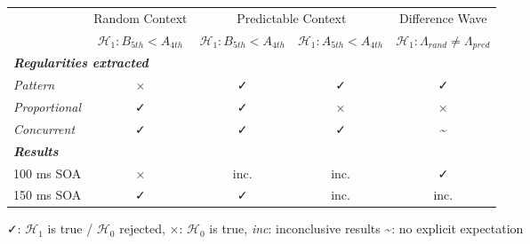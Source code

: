 

\begin{table}
\centering
\begin{tabular*}{\textwidth}{lcllc} 
\toprule
                                                                                                               & Random Context                               & \multicolumn{2}{c}{Predictable Context}               & Difference Wave                                                \\ 
\cmidrule(lr){2-2}\cmidrule(lr){3-4}\cmidrule(lr){5-5}
\multicolumn{1}{c}{}                                                                         & \multicolumn{1}{c}{$\mathcal{H_1}: B_{5th}<A_{4th}$} & $\mathcal{H_1}: B_{5th}<A_{4th}$     & $\mathcal{H_1}: A_{5th}<A_{4th}$     & \multicolumn{1}{c}{$\mathcal{H_1}: \Lambda_{rand} \neq \Lambda_{pred}$ }  \\ 
\midrule
\multicolumn{5}{l}{\textbf{\textit{Regularities extracted}}}  \\
\hspace{3mm}\textit{Pattern}                                                                                 & ×                                     & \multicolumn{1}{c}{✓} & \multicolumn{1}{c}{✓} & ✓                                                          \\
\hspace{3mm}\textit{Proportional}                                                                             & ✓                                     & \multicolumn{1}{c}{✓} & \multicolumn{1}{c}{×} & ×                                                          \\
\hspace{3mm}\textit{Concurrent} & ✓                                     & \multicolumn{1}{c}{✓} & \multicolumn{1}{c}{✓} & \textasciitilde{}                                          \\
\multicolumn{5}{l}{\textbf{\textit{Results}}}  \\
\hspace{3mm}100 ms SOA                                                                                                         & \multicolumn{1}{c}{×}                & \multicolumn{1}{c}{inc.}                 & \multicolumn{1}{c}{inc.}                    & \multicolumn{1}{c}{✓}                                      \\
\hspace{3mm}150 ms SOA                                                                                                        & \multicolumn{1}{c}{✓}                 & \multicolumn{1}{c}{✓}                      & \multicolumn{1}{c}{inc.}                    & \multicolumn{1}{c}{inc.}                                    \\
\bottomrule
\end{tabular*}
 \begin{tablenotes}
      \small
      \item ✓: $\mathcal{H_1}$ is true / $\mathcal{H_0}$ rejected, ×: $\mathcal{H_0}$ is true, \textit{inc}: inconclusive results \~{}: no explicit expectation
    \end{tablenotes}
\end{table}

